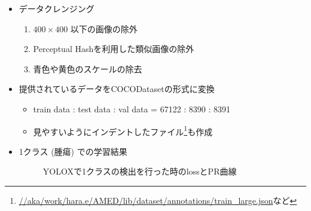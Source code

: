 \documentclass[a4j]{ujarticle}
\begin{document}
        \begin{itemize}
            \item データクレンジング
            \begin{enumerate}
                \item $400 \times 400$ 以下の画像の除外
                \item Perceptual Hashを利用した類似画像の除外
                \item 青色や黄色のスケールの除去
            \end{enumerate}

            \item 提供されているデータをCOCODatasetの形式に変換
            \begin{itemize}
                \item train data : test data : val data = 67122 : 8390 : 8391
                \item 見やすいようにインデントしたファイル\footnote{\url{//aka/work/hara.e/AMED/lib/dataset/annotations/train_large.json}など}も作成
            \end{itemize}

\clearpage

            \item 1クラス (腫瘍) での学習結果
                \begin{figure}[h]
                    \centering
                    \caption{YOLOX\cite{yolox}で1クラスの検出を行った時のlossとPR曲線}
                \end{figure}


\end{itemize}
\end{document}
